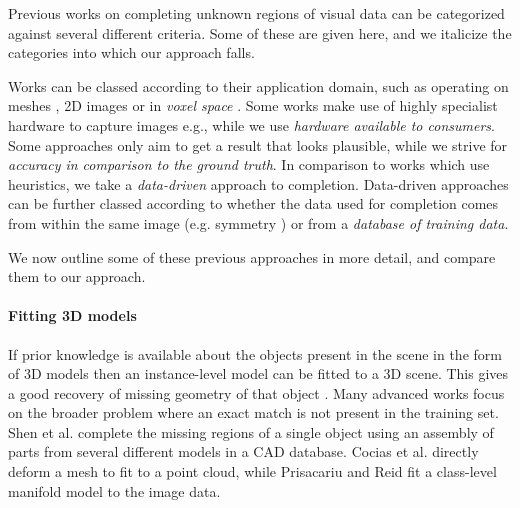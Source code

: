 \documentclass[10pt,twocolumn,letterpaper]{article}
\makeatletter
\renewcommand*{\eg}{e.g.\@\xspace}
\newcommand*{\ea}{et al.\@\xspace}
\makeatother
\begin{document}


Previous works on completing unknown regions of visual data can be categorized against several different criteria.
Some of these are given here, and we italicize the categories into which our approach falls.

Works can be classed according to their application domain, such as operating on meshes \cite{harary-tog-2013, schnabel-eurographics-2009}, 2D images \cite{gupta-cvpr-2011} or in \emph{voxel space} \cite{kim-iccv-2013}.
Some works make use of highly specialist hardware to capture images \eg \cite{velten-nature-2012}, while we use \emph{hardware available to consumers}.
Some approaches only aim to get a result that looks plausible, while we strive for \emph{accuracy in comparison to the ground truth}.
In comparison to works which use heuristics, we take a \emph{data-driven} approach to completion.
Data-driven approaches can be further classed according to whether the data used for completion comes from within the same image (\eg symmetry \cite{kroemer-humanoids-2012}) or from a \emph{database of training data}.

We now outline some of these previous approaches in more detail, and compare them to our approach.

\paragraph{Fitting 3D models}
If prior knowledge is available about the objects present in the scene in the form of 3D models then an instance-level model can be fitted to a 3D scene.
This gives a good recovery of missing geometry of that object \cite{hinterstoisser-accv-2012, drost-3dimpvt-2012}.
Many advanced works focus on the broader problem where an exact match is not present in the training set.
Shen \ea \cite{shen-tog-2012} complete the missing regions of a single object using an assembly of parts from several different models in a CAD database.
Cocias \ea \cite{cocias-cgvcv-2013} directly deform a mesh to fit to a point cloud, while Prisacariu and Reid \cite{prisacariu-iccv-2011} fit a class-level manifold model to the image data.
\end{document}
